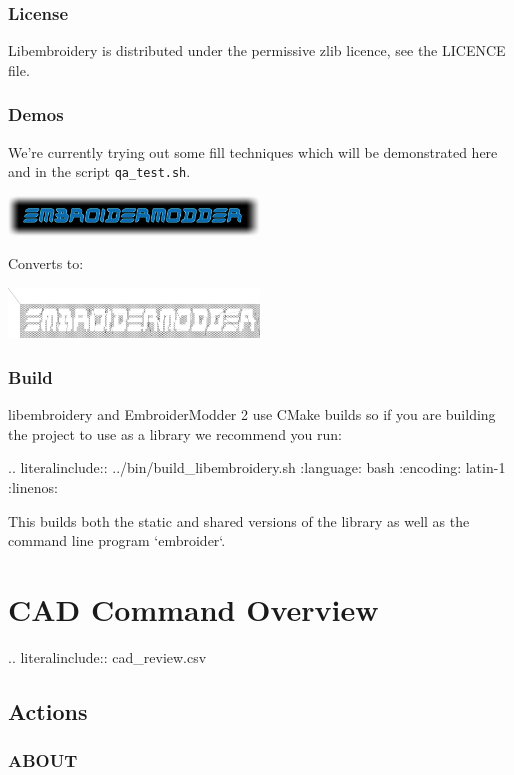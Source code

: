 \documentclass[a4paper]{report}
\begin{document}
\subsection{License}

Libembroidery is distributed under the permissive zlib licence, see the LICENCE file.

\subsection{Demos}

We're currently trying out some fill techniques which will be demonstrated here
and in the script \texttt{qa\_test.sh}.

\includegraphics[width=0.5\textwidth]{images/logo-spirals.png}

Converts to:

\includegraphics[width=0.5\textwidth]{images/logo_spirals_cross_stitch.png}

\subsection{Build}

libembroidery and EmbroiderModder 2 use CMake builds
so if you are building the project to use as a library we recommend
you run:

.. literalinclude:: ../bin/build\_libembroidery.sh
   :language: bash
   :encoding: latin-1
   :linenos:

This builds both the static and shared versions of the library as well
as the command line program `embroider`.

\chapter{CAD Command Overview}

.. literalinclude:: cad\_review.csv

\section{Actions}

\subsection{ABOUT}
\end{document}

